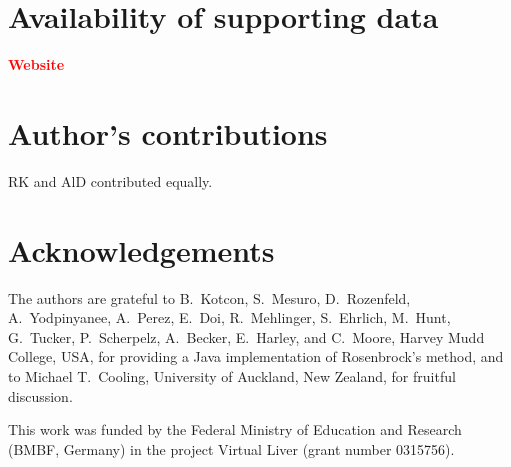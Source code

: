 \documentclass[10pt]{bmc_article}
\newenvironment{bmcformat}{\baselineskip20pt\sloppy\setboolean{publ}{false}}{\baselineskip20pt\sloppy}
\newcommand{\TODO}[1]{\textcolor{red}{\textbf{#1}}}
\begin{document}
\begin{bmcformat}
\section*{Availability of supporting data}

\TODO{Website}

\bigskip

\section*{Author's contributions}
   RK and AlD contributed equally.

    

\section*{Acknowledgements}
The authors are grateful to B.~Kotcon, S.~Mesuro, D.~Rozenfeld, A.~Yodpinyanee,
A.~Perez, E.~Doi, R.~Mehlinger, S.~Ehrlich, M.~Hunt, G.~Tucker, P.~Scherpelz,
A.~Becker, E.~Harley, and C.~Moore, Harvey Mudd College, USA, for providing a
Java implementation of Rosenbrock's method, and to Michael T.~Cooling,
University of Auckland, New Zealand, for fruitful discussion.

This work was funded by the Federal Ministry of Education and Research (BMBF,
Germany) in the project Virtual Liver (grant number 0315756).
 

\newpage
{
   }     %


\end{bmcformat}
\end{document}

